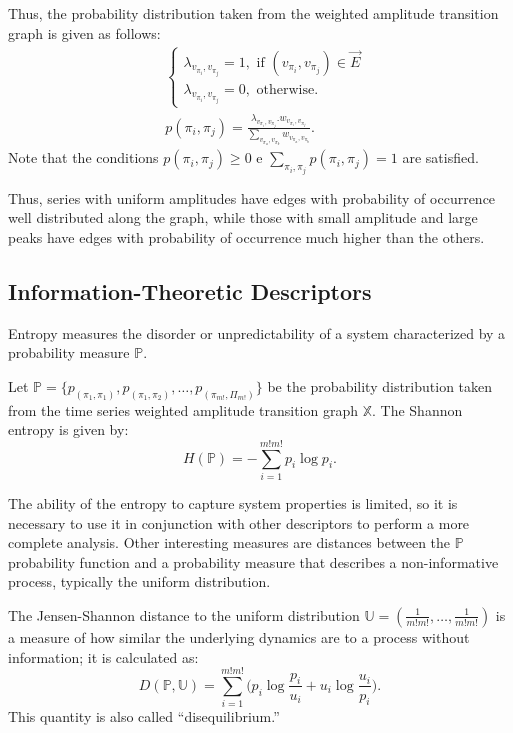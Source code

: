 \documentclass{isprs}
\begin{document}
Thus, the probability distribution taken from the weighted amplitude transition graph is given as follows:	
\begin{align}
&\left\{\begin{array}{l}
\lambda_{v_{\pi_i}, v_{\pi_j}} = 1, \text{ if } (v_{\pi_i}, v_{\pi_j}) \in \vec{E} \\
\lambda_{v_{\pi_i}, v_{\pi_j}} = 0, \text{ otherwise}.
\end{array}\right. \\
%
&p(\pi_i, \pi_j) = \frac{\lambda_{v_{\pi_i}, v_{\pi_j}} . w_{v_{\pi_i}, v_{\pi_j}}}{\sum_{v_{\pi_a}, v_{\pi_b}} w_{v_{\pi_a}, v_{\pi_b}}}.
\end{align}
Note that the conditions $p(\pi_i, \pi_j) \ge 0$ e $\sum_{\pi_i, \pi_j} p(\pi_i, \pi_j) = 1$ are satisfied.

Thus, series with uniform amplitudes have edges with probability of occurrence well distributed along the graph, while those with small amplitude and large peaks have edges with probability of occurrence much higher than the others.

\subsection{Information-Theoretic Descriptors}\label{HC}

Entropy measures the disorder or unpredictability of a system characterized by a probability measure $\mathbb{P}$.

Let $\mathbb{P} = \{p_{(\pi_1, \pi_1)}, p_{(\pi_1, \pi_2)}, \dots, p_{(\pi_{m!}, \Pi_{m!})} \}$ be the probability distribution taken from the time series weighted amplitude transition graph $\mathbb{X}$.
The Shannon entropy is given by:	
\begin{equation}
H(\mathbb{P}) = -\sum_{i=1}^{m!m!} p_i \log p_i .
\label{eq:Entropia}
\end{equation}

The ability of the entropy to capture system properties is limited, so it is necessary to use it in conjunction with other descriptors to perform a more complete analysis.
Other interesting measures are distances between the $\mathbb{P}$ probability function and a probability measure that describes a non-informative process, typically the uniform distribution.

The Jensen-Shannon distance to the uniform distribution $\mathbb{U} = (\frac{1}{m!m!}, \dots, \frac{1}{m!m!})$ is a measure of how similar the underlying dynamics are to a process without information; it is calculated as:
\begin{equation}
D(\mathbb{P}, \mathbb{U}) = \sum_{i=1}^{m!m!} \Big(p_i \log\frac{p_i}{u_i} +
u_i \log\frac{u_i}{p_i}
\Big).
\end{equation}
This quantity is also called ``disequilibrium.''
\end{document}

